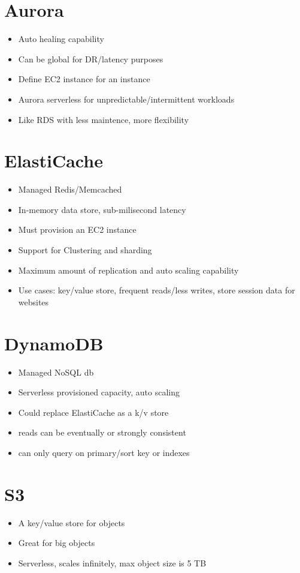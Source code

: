 \documentclass[]{scrartcl}
\begin{document}
\section{Aurora}
\begin{itemize}
	\item Auto healing capability
	\item Can be global for DR/latency purposes
	\item Define EC2 instance for an instance
	\item Aurora serverless for unpredictable/intermittent workloads
	\item Like RDS with less maintence, more flexibility
\end{itemize}

\section{ElastiCache}
\begin{itemize}
	\item Managed Redis/Memcached
	\item In-memory data store, sub-milisecond latency
	\item Must provision an EC2 instance
	\item Support for Clustering and sharding
	\item Maximum amount of replication and auto scaling capability
	\item Use cases: key/value store, frequent reads/less writes, store session data for websites
\end{itemize}

\section{DynamoDB}
\begin{itemize}
	\item Managed NoSQL db
	\item Serverless provisioned capacity, auto scaling
	\item Could replace ElastiCache as a k/v store
	\item reads can be eventually or strongly consistent
	\item can only query on primary/sort key or indexes
\end{itemize}

\section{S3}
\begin{itemize}
	\item A key/value store for objects
	\item Great for big objects
	\item Serverless, scales infinitely, max object size is 5 TB
\end{itemize}
\end{document}
